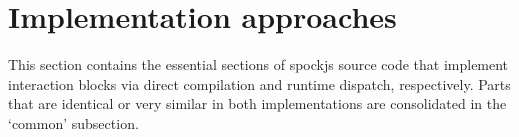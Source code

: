 \section*{Implementation approaches}

This section contains the essential sections of spockjs source code
that implement interaction blocks via
direct compilation and runtime dispatch, respectively.
Parts that are identical or very similar in both implementations
are consolidated in the `common' subsection.






